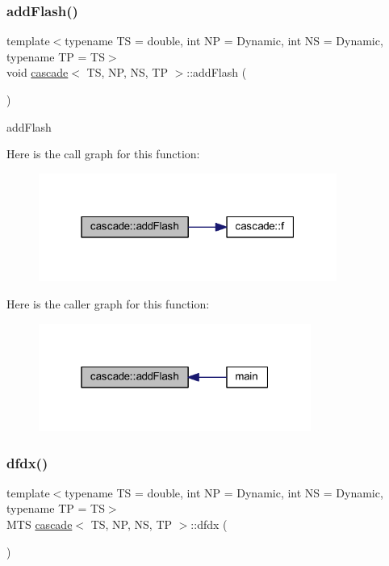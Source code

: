 \subsubsection{\texorpdfstring{add\+Flash()}{addFlash()}}
{\footnotesize\ttfamily template$<$typename TS = double, int NP = Dynamic, int NS = Dynamic, typename TP = TS$>$ \\
void \mbox{\hyperlink{classcascade}{cascade}}$<$ TS, NP, NS, TP $>$\+::add\+Flash (\begin{DoxyParamCaption}{ }\end{DoxyParamCaption})\hspace{0.3cm}{\ttfamily [inline]}}



add\+Flash 

Here is the call graph for this function\+:\nopagebreak
\begin{figure}[H]
\begin{center}
\leavevmode
\includegraphics[width=277pt]{classcascade_ae1aae44e18b9d87cb710c54726726baa_cgraph}
\end{center}
\end{figure}
Here is the caller graph for this function\+:\nopagebreak
\begin{figure}[H]
\begin{center}
\leavevmode
\includegraphics[width=253pt]{classcascade_ae1aae44e18b9d87cb710c54726726baa_icgraph}
\end{center}
\end{figure}
\mbox{\label{classcascade_ac72705f0ad01cc88d43c002d63acce13}} 
\subsubsection{\texorpdfstring{dfdx()}{dfdx()}}
{\footnotesize\ttfamily template$<$typename TS = double, int NP = Dynamic, int NS = Dynamic, typename TP = TS$>$ \\
M\+TS \mbox{\hyperlink{classcascade}{cascade}}$<$ TS, NP, NS, TP $>$\+::dfdx (\begin{DoxyParamCaption}{ }\end{DoxyParamCaption})\hspace{0.3cm}{\ttfamily [inline]}}



